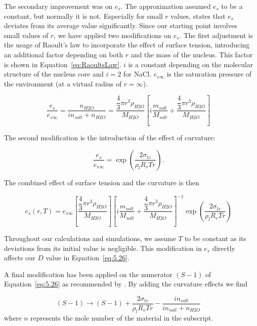 \documentclass[titlepage]{article}
\begin{document}
The secondary improvement was on $e_{s}$. The approximation assumed $e_{s}$ to
be a constant, but normally it is not. Especially for small $r$ values,
\cite{Best} states that $e_{s}$ deviates from its average value significantly.
Since our starting point involves small values of $r$, we have applied two
modifications on $e_{s}$. The first adjustment is the usage of Raoult's law to
incorporate the effect of surface tension, introducing an additional factor
depending on both $r$ and the mass of the nucleus. This factor is shown in
Equation~\eqref{eq:RaoultsLaw}. $i$ is a constant depending on the molecular
structure of the nucleus core and $i=2$ for NaCl. $e_{s\infty}$ is the
saturation pressure of the environment (at a virtual radius of $r=\infty$).

\begin{equation}
    \label{eq:RaoultsLaw}
    \dfrac{e_{s}}{e_{s\infty}} = \dfrac{n_{H2O}}{i n_{solt}+n_{H2O}} = \dfrac{\dfrac{4}{3}\pi r^{3} \rho_{H2O}}{M_{H2O}} \left[ i \dfrac{m_{solt}}{M_{solt}} + \dfrac{\dfrac{4}{3}\pi r^{3} \rho_{H2O}}{M_{H2O}} \right]
\end{equation}

The second modification is the introduction of the effect of curvature:

\begin{equation}
    \label{eq:Curvature}
    \dfrac{e_{s}}{e_{s\infty}}=\exp \left( \dfrac{2\sigma_{lv}}{\rho_{l}R_{v}Tr} \right) .
\end{equation}

The combined effect of surface tension and the curvature is then

\begin{equation}
    \label{eq:EsDefinition}
    e_{s}(r,T) = e_{s\infty} \left[ \dfrac{\dfrac{4}{3}\pi r^{3} \rho_{H2O}}{M_{H2O}} \right] \left[ i \dfrac{m_{solt}}{M_{solt}} + \dfrac{\dfrac{4}{3}\pi r^{3} \rho_{H2O}}{M_{H2O}} \right] ^{-1} \exp \left( \dfrac{2\sigma_{lv}}{\rho_{l}R_{v}Tr} \right)
\end{equation}

Throughout our calculations and simulations, we assume $T$ to be constant as
its deviations from its initial value is negligible. This modification in
$e_{s}$ directly affects our $D$ value in Equation~\eqref{eq:5.26}.


A final modification has been applied on the numerator $(S-1)$ of
Equation~\eqref{eq:5.26} as recommended by \cite{Mason}. By adding the
curvature effects we find

\begin{equation}
    \label{eq:Numerator}
    (S-1) \rightarrow (S-1)+\dfrac{2\sigma_{lv}}{\rho_{l}R_{v}Tr}-\dfrac{i n_{solt}}{i n_{solt}+n_{H2O}}
\end{equation}
where $n$ represents the mole number of the material in the subscript.
\end{document}
